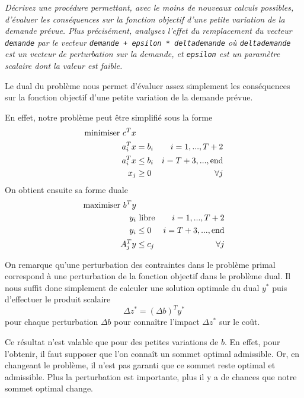 \question %
\emph{Décrivez une procédure permettant, avec le moins de nouveaux calculs
possibles, d'évaluer les conséquences sur la fonction objectif d’une petite
variation de la demande prévue. Plus précisément, analysez l'effet du
remplacement du vecteur \texttt{demande}
par le vecteur \texttt{demande + epsilon * delta\textunderscore demande}
où \texttt{delta\textunderscore demande} est un vecteur de perturbation
sur la demande,
et \texttt{epsilon} est un paramètre scalaire dont la valeur est faible.}

Le dual du problème nous permet d'évaluer assez simplement
les conséquences sur la fonction objectif
d'une petite variation de la demande prévue.

En effet, notre problème peut être simplifié sous la forme
\begin{align*}
	\text{minimiser } c^T x \\
	a_i^T x &= b_i  & i = 1,...,T+2 \\
  a_i^T x &\leq b_i & i = T+3,...,\text{end} \\
	x_j &\geq 0 & \forall j
\end{align*}
On obtient ensuite sa forme duale
\begin{align*}
	\text{maximiser } b^T y \\
	y_i &\text{ libre} & i = 1,...,T+2 \\
  y_i &\leq 0 & i = T+3,...,\text{end} \\
  A_j^T y &\leq c_j & \forall j
\end{align*}

On remarque qu'une perturbation des contraintes dans le problème primal
correspond à une perturbation de la fonction objectif dans le problème dual.
Il nous suffit donc simplement de calculer une solution optimale du dual $y^{*}$
puis d'effectuer le produit scalaire
\[ \Delta z^{*} = (\Delta b)^T y^{*} \]
pour chaque perturbation $\Delta b$ pour conna\^itre l'impact $\Delta z^{*}$
sur le coût.

Ce résultat n'est valable que pour des petites variations de $b$.
En effet, pour l'obtenir, il faut supposer que l'on connaît un sommet optimal admissible.
Or, en changeant le problème, il n'est pas garanti que ce sommet reste optimal et admissible.
Plus la perturbation est importante, plus il y a de chances que notre sommet optimal change.
